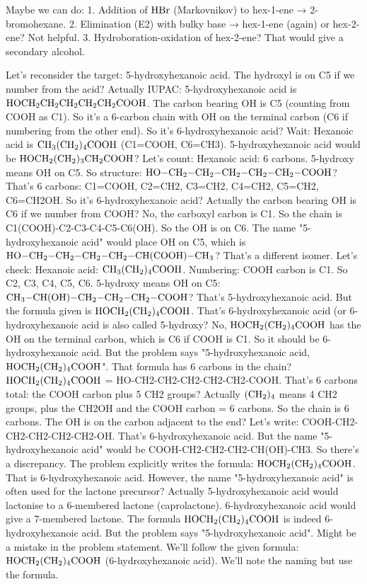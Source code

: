 \documentclass[11pt]{article}
\begin{document}
\begin{corrige}
Maybe we can do:
1. Addition of \(\ce{HBr}\) (Markovnikov) to hex-1-ene → 2-bromohexane.
2. Elimination (E2) with bulky base → hex-1-ene (again) or hex-2-ene? Not helpful.
3. Hydroboration-oxidation of hex-2-ene? That would give a secondary alcohol.

Let's reconsider the target: 5-hydroxyhexanoic acid. The hydroxyl is on C5 if we number from the acid? Actually IUPAC: 5-hydroxyhexanoic acid is \(\ce{HOCH2CH2CH2CH2CH2COOH}\). The carbon bearing OH is C5 (counting from COOH as C1). So it's a 6-carbon chain with OH on the terminal carbon (C6 if numbering from the other end). So it's 6-hydroxyhexanoic acid? Wait: Hexanoic acid is \(\ce{CH3(CH2)4COOH}\) (C1=COOH, C6=CH3). 5-hydroxyhexanoic acid would be \(\ce{HOCH2(CH2)3CH2COOH}\)? Let's count: Hexanoic acid: 6 carbons. 5-hydroxy means OH on C5. So structure: \(\ce{HO-CH2-CH2-CH2-CH2-CH2-COOH}\)? That's 6 carbons: C1=COOH, C2=CH2, C3=CH2, C4=CH2, C5=CH2, C6=CH2OH. So it's 6-hydroxyhexanoic acid? Actually the carbon bearing OH is C6 if we number from COOH? No, the carboxyl carbon is C1. So the chain is C1(COOH)-C2-C3-C4-C5-C6(OH). So the OH is on C6. The name "5-hydroxyhexanoic acid" would place OH on C5, which is \(\ce{HO-CH2-CH2-CH2-CH2-CH(COOH)-CH3}\)? That's a different isomer. Let's check: Hexanoic acid: \(\ce{CH3(CH2)4COOH}\). Numbering: COOH carbon is C1. So C2, C3, C4, C5, C6. 5-hydroxy means OH on C5: \(\ce{CH3-CH(OH)-CH2-CH2-CH2-COOH}\)? That's 5-hydroxyhexanoic acid. But the formula given is \(\ce{HOCH2(CH2)4COOH}\). That's 6-hydroxyhexanoic acid (or 6-hydroxyhexanoic acid is also called 5-hydroxy? No, \(\ce{HOCH2(CH2)4COOH}\) has the OH on the terminal carbon, which is C6 if COOH is C1. So it should be 6-hydroxyhexanoic acid. But the problem says "5-hydroxyhexanoic acid, \(\ce{HOCH2(CH2)4COOH}\)". That formula has 6 carbons in the chain? \(\ce{HOCH2(CH2)4COOH}\) = HO-CH2-CH2-CH2-CH2-CH2-COOH. That's 6 carbons total: the COOH carbon plus 5 CH2 groups? Actually \(\ce{(CH2)4}\) means 4 CH2 groups, plus the CH2OH and the COOH carbon = 6 carbons. So the chain is 6 carbons. The OH is on the carbon adjacent to the end? Let's write: COOH-CH2-CH2-CH2-CH2-CH2-OH. That's 6-hydroxyhexanoic acid. But the name "5-hydroxyhexanoic acid" would be COOH-CH2-CH2-CH2-CH(OH)-CH3. So there's a discrepancy. The problem explicitly writes the formula: \(\ce{HOCH2(CH2)4COOH}\). That is 6-hydroxyhexanoic acid. However, the name "5-hydroxyhexanoic acid" is often used for the lactone precursor? Actually 5-hydroxyhexanoic acid would lactonise to a 6-membered lactone (caprolactone). 6-hydroxyhexanoic acid would give a 7-membered lactone. The formula \(\ce{HOCH2(CH2)4COOH}\) is indeed 6-hydroxyhexanoic acid. But the problem says "5-hydroxyhexanoic acid". Might be a mistake in the problem statement. We'll follow the given formula: \(\ce{HOCH2(CH2)4COOH}\) (6-hydroxyhexanoic acid). We'll note the naming but use the formula.


\end{corrige}
\end{document}

